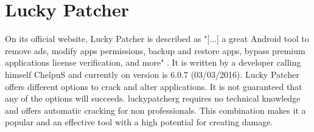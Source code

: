 \section{Lucky Patcher} \label{section:luckypatcher-explain}
On its official website, Lucky Patcher is described as "[...] a great Android tool to remove ads, modify apps permissions, backup and restore apps, bypass premium applications license verification, and more" \cite{luckyPatcherOfficial}.
It is written by a developer calling himself ChelpuS and currently on version is 6.0.7 (03/03/2016).
\newline
Lucky Patcher offers different options to crack and alter applications.
It is not guaranteed that any of the options will succeeds. \cite{luckyPatcherOfficial}
\newline
\gls{luckypatcherg} requires no technical knowledge and offers automatic cracking for non professionals.
This combination makes it a popular and an effective tool with a high potential for creating damage.
\newline
